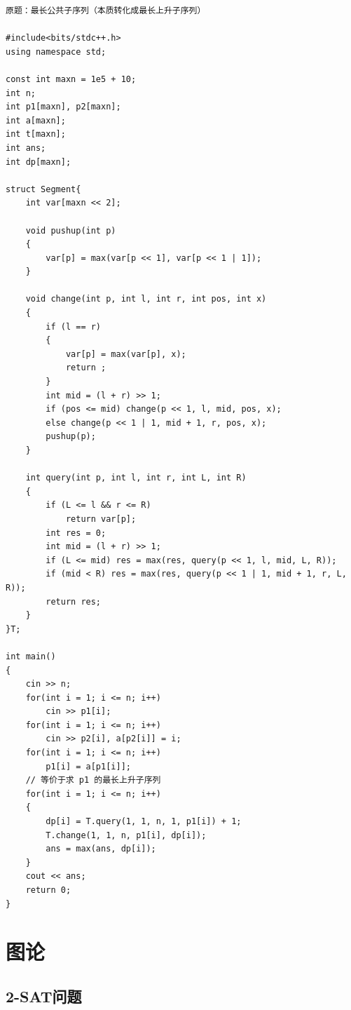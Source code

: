 \documentclass[11pt,a4paper]{ctexart}
\begin{document}
\begin{lstlisting}
原题：最长公共子序列（本质转化成最长上升子序列）

#include<bits/stdc++.h>
using namespace std;

const int maxn = 1e5 + 10;
int n;
int p1[maxn], p2[maxn];
int a[maxn];
int t[maxn];
int ans;
int dp[maxn];

struct Segment{
    int var[maxn << 2];

    void pushup(int p)
    {
        var[p] = max(var[p << 1], var[p << 1 | 1]);
    }

    void change(int p, int l, int r, int pos, int x)
    {
        if (l == r)
        {
            var[p] = max(var[p], x);
            return ;
        }
        int mid = (l + r) >> 1;
        if (pos <= mid) change(p << 1, l, mid, pos, x);
        else change(p << 1 | 1, mid + 1, r, pos, x);
        pushup(p);
    }

    int query(int p, int l, int r, int L, int R)
    {
        if (L <= l && r <= R)
            return var[p];
        int res = 0;
        int mid = (l + r) >> 1;
        if (L <= mid) res = max(res, query(p << 1, l, mid, L, R));
        if (mid < R) res = max(res, query(p << 1 | 1, mid + 1, r, L, R));
        return res;
    }
}T;

int main()
{
	cin >> n;
	for(int i = 1; i <= n; i++)
		cin >> p1[i];
	for(int i = 1; i <= n; i++)
		cin >> p2[i], a[p2[i]] = i;
	for(int i = 1; i <= n; i++)
		p1[i] = a[p1[i]];
    // 等价于求 p1 的最长上升子序列
	for(int i = 1; i <= n; i++)
	{
		dp[i] = T.query(1, 1, n, 1, p1[i]) + 1;
		T.change(1, 1, n, p1[i], dp[i]);
		ans = max(ans, dp[i]);
	}
	cout << ans;
	return 0;
}
\end{lstlisting}

\section{图论}

\subsection{2-SAT问题}
\end{document}
